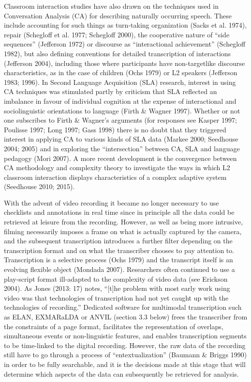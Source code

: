 \documentclass[11pt]{article}
\newenvironment{styleStandard}{\renewcommand\baselinestretch{1.25}\setlength\leftskip{0cm}\setlength\rightskip{0cm plus 1fil}\setlength\parindent{0cm}\setlength\parfillskip{0pt plus 1fil}\setlength\parskip{0in plus 1pt}\writerlistparindent\writerlistleftskip\leavevmode\normalfont\normalsize\writerlistlabel\ignorespaces}{\unskip\vspace{0.139in plus 0.0139in}\par}
\newcommand\writerlistleftskip{}
\newcommand\writerlistparindent{}
\newcommand\writerlistlabel{}
\begin{document}
\begin{styleStandard}
Classroom interaction studies have also drawn on the techniques used in Conversation Analysis (CA) for describing naturally occurring speech. These include accounting for such things as turn-taking organization (Sacks et al. 1974), repair (Schegloff et al. 1977; Schegloff 2000), the cooperative nature of “side sequences” (Jefferson 1972) or discourse as “interactional achievement” (Schegloff 1982), but also defining conventions for detailed transcription of interactions (Jefferson 2004), including those where participants have non-targetlike discourse characteristics, as in the case of children (Ochs 1979) or L2 speakers (Jefferson 1983; 1996). In Second Language Acquisition (SLA) research, interest in using CA techniques was stimulated partly by criticism that SLA reflected an imbalance in favour of individual cognition at the expense of interactional and sociolinguistic orientations to language (Firth \& Wagner 1997). Whether or not one subscribes to Firth \& Wagner’s arguments (for responses see Kasper 1997; Poulisse 1997; Long 1997; Gass 1998) there is no doubt that they triggered interest in applying CA to various kinds of SLA data (Markee 2000; Seedhouse 2004; 2005) and in exploring the “intersection” between CA, SLA and language pedagogy (Mori 2007). A more recent development is the convergence between CA methodology and complexity theory to investigate the ways in which L2 classroom interaction displays characteristics of a complex adaptive system (Seedhouse 2010; 2015).
\end{styleStandard}

\begin{styleStandard}
With the advent of video recording it became no longer necessary to use checklists and annotations in real time since in principle all the data could be retrieved at leisure from the recording. However, as well as being more intrusive, filming necessarily imposes a frame on what is actually captured by the camera, and the subsequent transcription introduces a further filter depending on the transcription format and on what the transcriber chooses to pay attention to. Transcription is a selective process (Ochs 1979) and the transcript itself is an evolving flexible object (Mondada 2007). Researchers often continued to use a play-script format ill-adapted to the complexity of video data (see Erickson 2004). As Jones (2013: 17) notes, “[t]he problem with most early work using video was that technologies of transcription had not yet caught up with the technologies of recording.” Dedicated software for multimodal transcription such as ELAN, EXMARaLDA or ANVIL (section 3.3 below) frees the transcriber from the constraints of a page format, facilitates the representation of overlaps, simultaneous events or non-linguistic features, and enables transcription segments to be time-linked to the digital recording. However, the raw data of the recording still have to go through a process of “entextualization” (Baumann \& Briggs 1990) in order to be fully searchable, and it is the decisions made at this stage that will determine which aspects of the data can subsequently be retrieved for analysis. 
\end{styleStandard}
\end{document}
